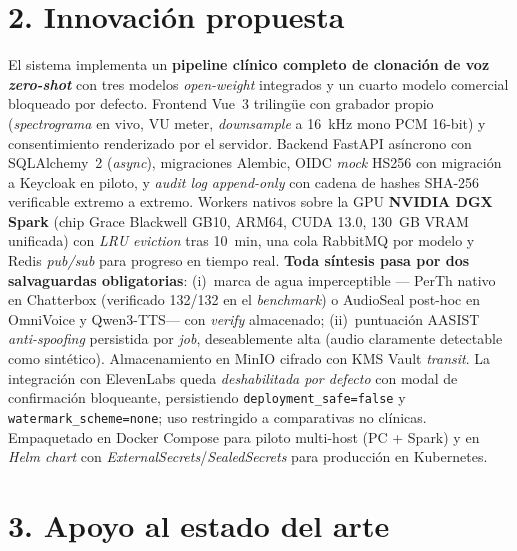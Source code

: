 \documentclass[11pt,a4paper]{article}
\begin{document}
\section*{2. Innovación propuesta}

El sistema implementa un \textbf{pipeline clínico completo de clonación de voz \emph{zero-shot}} con tres modelos \emph{open-weight} integrados y un cuarto modelo comercial bloqueado por defecto. Frontend Vue~3 trilingüe con grabador propio (\emph{spectrograma} en vivo, VU meter, \emph{downsample} a 16~kHz mono PCM 16-bit) y consentimiento renderizado por el servidor. Backend FastAPI asíncrono con SQLAlchemy~2 (\emph{async}), migraciones Alembic, OIDC \emph{mock} HS256 con migración a Keycloak en piloto, y \emph{audit log append-only} con cadena de hashes SHA-256 verificable extremo a extremo. Workers nativos sobre la GPU \textbf{NVIDIA DGX Spark} (chip Grace Blackwell GB10, ARM64, CUDA 13.0, 130~GB VRAM unificada) con \emph{LRU eviction} tras 10~min, una cola RabbitMQ por modelo y Redis \emph{pub/sub} para progreso en tiempo real. \textbf{Toda síntesis pasa por dos salvaguardas obligatorias}: (i)~marca de agua imperceptible --- PerTh nativo en Chatterbox (verificado 132/132 en el \emph{benchmark}) o AudioSeal post-hoc en OmniVoice y Qwen3-TTS--- con \emph{verify} almacenado; (ii)~puntuación AASIST \emph{anti-spoofing} persistida por \emph{job}, deseablemente alta (audio claramente detectable como sintético). Almacenamiento en MinIO cifrado con KMS Vault \emph{transit}. La integración con ElevenLabs queda \emph{deshabilitada por defecto} con modal de confirmación bloqueante, persistiendo \texttt{deployment\_safe=false} y \texttt{watermark\_scheme=none}; uso restringido a comparativas no clínicas. Empaquetado en Docker Compose para piloto multi-host (PC + Spark) y en \emph{Helm chart} con \emph{ExternalSecrets}/\emph{SealedSecrets} para producción en Kubernetes.

\section*{3. Apoyo al estado del arte}
\end{document}
